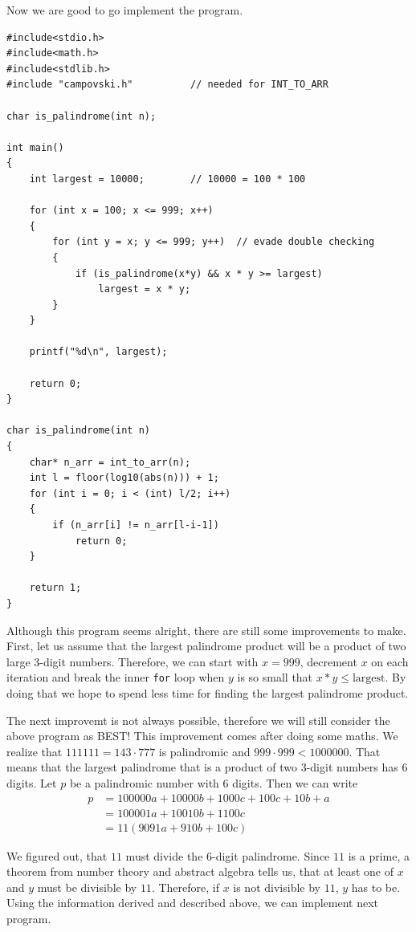\documentclass{book}
\begin{document}
Now we are good to go implement the program.

\begin{verbatim}
#include<stdio.h>
#include<math.h>
#include<stdlib.h>
#include "campovski.h"          // needed for INT_TO_ARR

char is_palindrome(int n);

int main()
{
    int largest = 10000;        // 10000 = 100 * 100

    for (int x = 100; x <= 999; x++)
    {
        for (int y = x; y <= 999; y++)  // evade double checking
        {
            if (is_palindrome(x*y) && x * y >= largest)
                largest = x * y;
        }
    }

    printf("%d\n", largest);

    return 0;
}

char is_palindrome(int n)
{
    char* n_arr = int_to_arr(n);
    int l = floor(log10(abs(n))) + 1;
    for (int i = 0; i < (int) l/2; i++)
    {
        if (n_arr[i] != n_arr[l-i-1])
            return 0;
    }

    return 1;
}
\end{verbatim}

Although this program seems alright, there are still some improvements to make. First, let us assume that the largest palindrome product will be a product of two large 3-digit numbers. Therefore, we can start with $x = 999$, decrement $x$ on each iteration and break the inner \texttt{for} loop when $y$ is so small that $x * y \leq \textrm{largest}$. By doing that we hope to spend less time for finding the largest palindrome product.

The next improvemt is not always possible, therefore we will still consider the above program as BEST! This improvement comes after doing some maths. We realize that $111111 = 143\cdot 777$ is palindromic and $999 \cdot 999 < 1000000$. That means that the largest palindrome that is a product of two 3-digit numbers has 6 digits. Let $p$ be a palindromic number with 6 digits. Then we can write
\begin{align*}
p &= 100000a + 10000b + 1000c + 100c + 10b+ a\\
&= 100001a + 10010b + 1100c\\
&= 11(9091a + 910b + 100c)
\end{align*}

We figured out, that $11$ must divide the 6-digit palindrome. Since $11$ is a prime, a theorem from number theory and abstract algebra tells us, that at least one of $x$ and $y$ must be divisible by $11$. Therefore, if $x$ is not divisible by $11$, $y$ has to be. Using the information derived and described above, we can implement next program.
\end{document}
